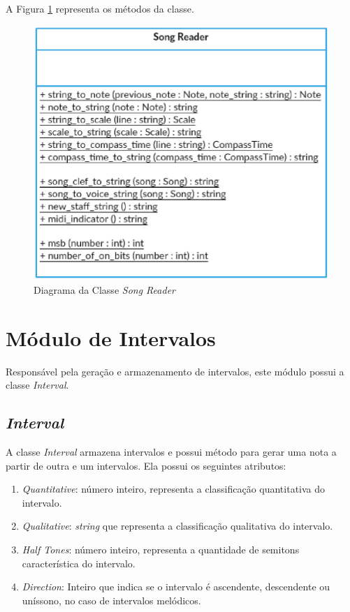       A Figura \ref{songreaderclass} representa os métodos da classe.

      \begin{figure}[htb]
        \centering
        \includegraphics[scale=0.8]{figuras/songreaderclass.eps}
        \caption{Diagrama da Classe \textit{Song Reader}}
        \label{songreaderclass}
      \end{figure}

  \section[Módulo de Intervalos]{Módulo de Intervalos}

    Responsável pela geração e armazenamento de intervalos, este módulo possui a classe \textit{Interval}.


    \subsection[\textit{Interval}]{\textit{Interval}}

      A classe \textit{Interval} armazena intervalos e possui método para gerar uma nota a partir de outra e um intervalos. Ela possui os seguintes atributos:

      \begin{enumerate}
        \item \textit{Quantitative}: número inteiro, representa a classificação quantitativa do intervalo.
        \item \textit{Qualitative}: \textit{string} que representa a classificação qualitativa do intervalo.
        \item \textit{Half Tones}: número inteiro, representa a quantidade de semitons característica do intervalo.
        \item \textit{Direction}: Inteiro que indica se o intervalo é ascendente, descendente ou uníssono, no caso de intervalos melódicos.
      \end{enumerate}

